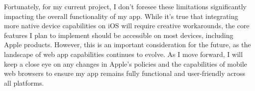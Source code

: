 Fortunately, for my current project, I don’t foresee these limitations significantly impacting the overall functionality of my app. While it’s true that integrating more native device capabilities on iOS will require creative workarounds, the core features I plan to implement should be accessible on most devices, including Apple products. However, this is an important consideration for the future, as the landscape of web app capabilities continues to evolve. As I move forward, I will keep a close eye on any changes in Apple’s policies and the capabilities of mobile web browsers to ensure my app remains fully functional and user-friendly across all platforms.
